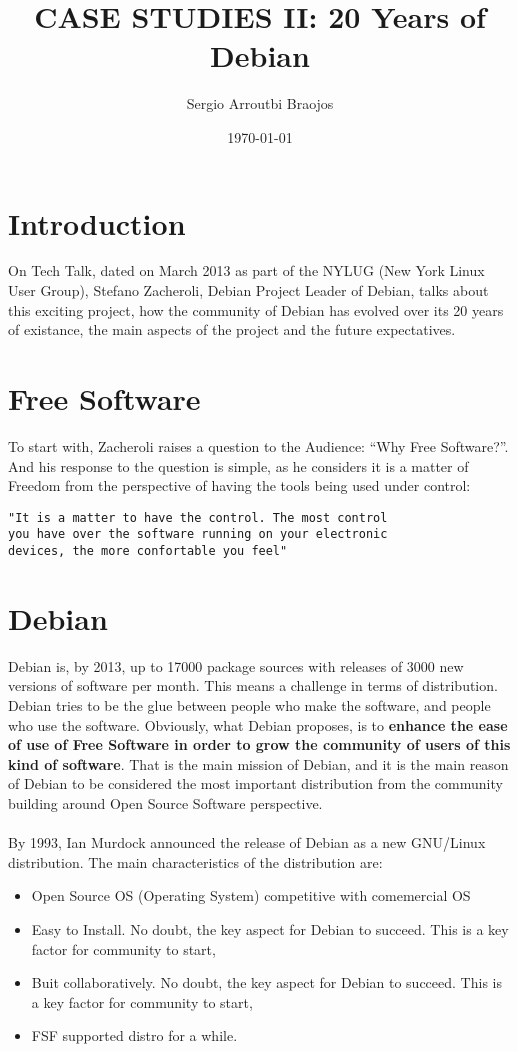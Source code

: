 \documentclass[11pt]{article}
\title{\textbf{CASE STUDIES II: 20 Years of Debian}}
\author{Sergio Arroutbi Braojos}
\date{\today}
\begin{document}
\maketitle

\section{Introduction}
On Tech Talk, dated on March 2013 as part of the NYLUG (New York Linux User Group), Stefano Zacheroli, Debian Project Leader of Debian, talks about this exciting project, how the community of Debian has evolved over its 20 years of existance, the main aspects of the project and the future expectatives. 

\section{Free Software}
To start with, Zacheroli raises a question to the Audience: ``Why Free Software?''. And his response to the question is simple, as he considers it is a matter of Freedom from the perspective of having the tools being used under control:
\begin{verbatim}
"It is a matter to have the control. The most control
you have over the software running on your electronic
devices, the more confortable you feel"
\end{verbatim}

\section{Debian}
Debian is, by 2013, up to 17000 package sources with releases of 3000 new versions of software per month. This means a challenge in terms of distribution. Debian tries to be the glue between people who make the software, and people who use the software. Obviously, what Debian proposes, is to \textbf{enhance the ease of use of Free Software in order to grow the community of users of this kind of software}. That is the main mission of Debian, and it is the main reason of Debian to be considered the most important distribution from the community building around Open Source Software perspective.\\
\\
By 1993, Ian Murdock announced the release of Debian as a new GNU/Linux distribution. The main characteristics of the distribution are:
\begin{itemize}\itemsep0pt
\item{Open Source OS (Operating System) competitive with comemercial OS}
\item{Easy to Install}. No doubt, the key aspect for Debian to succeed. This is a key factor for community to start, 
\item{Buit collaboratively}. No doubt, the key aspect for Debian to succeed. This is a key factor for community to start, 
\item{FSF supported distro for a while}.
\end{itemize}
\end{document}
